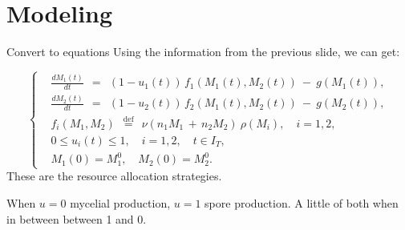 \documentclass{beamer}
\begin{document}
\section{Modeling}

\begin{frame}{Convert to equations}
    Using the information from the previous slide, we can get:
    
    $$ 
    \left\{ \begin{aligned}
    & \frac{d M_1(t)}{dt} \:\: = \:\: (1 - u_1(t)) \, f_1(M_1(t), M_2(t)) \: - \: g(M_1(t)), \\
    & \frac{d M_2(t)}{dt} \:\: = \:\: (1 - u_2(t)) \, f_2(M_1(t), M_2(t)) \: - \: g(M_2(t)), \\
    & f_i(M_1, M_2) \:\: \stackrel{\mathrm{def}}{=} \:\: \nu(n_1 M_1 \, + \, n_2 M_2) \: \rho(M_i), \quad i = 1,2, \\
    & 0 \leqslant u_i(t) \leqslant 1, \quad i = 1,2, \quad t \in I_T, \\
    & M_1(0) = M_1^0, \quad M_2(0) = M_2^0.
    \end{aligned} \right.
    $$
    \pause
    These are the resource allocation strategies.\newline
    
    \pause
    
    When $u = 0$ mycelial production, $u = 1$ spore production.
    A little of both when in between between 1 and 0.
\end{frame}
\end{document}

